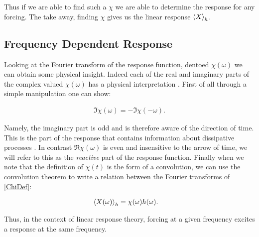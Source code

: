 \noindent Thus if we are able to find such a $\chi$ we are able to determine the response for any forcing. The take away, finding $\chi$ gives us the linear response $\expval{X}_h$.


\subsection{Frequency Dependent Response}

Looking at the Fourier transform of the response function, dentoed $\chi(\omega)$ we can obtain some physical insight. Indeed each of the real and imaginary parts of the complex valued $\chi(\omega)$ has a physical interpretation \cite{LiviPoliti2017}. First of all through a simple manipulation one can show:

\begin{align}
\Im{\chi(\omega)} = - \Im{\chi(-\omega)}. 
\end{align} 

\noindent Namely, the imaginary part is odd and is therefore aware of the direction of time. This is the part of the response that contains information about dissipative processes \cite{LiviPoliti2017}. In contrast $\Re{\chi(\omega)}$ is even and insensitive to the arrow of time, we will refer to this as the \textit{reactive} part of the response function. Finally when we note that the definition of $\chi(t)$ is the form of a convolution, we can use the convolution theorem to write a relation between the Fourier transforms of \ref{ChiDef}:

\begin{align}
\expval{X(\omega)}_h &= \chi(\omega) h(\omega).
\end{align}

\noindent Thus, in the context of linear response theory, forcing at a given frequency excites a response at the same frequency.
